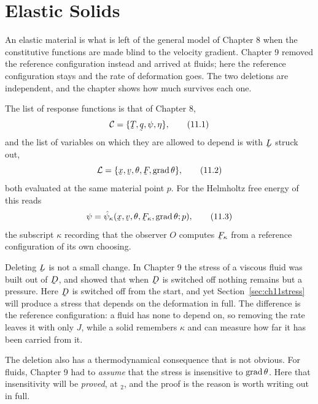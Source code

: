 \chapter{Elastic Solids}

An elastic material is what is left of the general model of Chapter 8
when the constitutive functions are made blind to the velocity gradient.
Chapter 9 removed the reference configuration instead and arrived at
fluids; here the reference configuration stays and the rate of
deformation goes. The two deletions are independent, and the chapter
shows how much survives each one.

The list of response functions is that of Chapter 8,
\begin{equation}
   \mathcal{C}=\{\bT,\bq,\psi,\eta\},
   \tag{11.1}\label{eq:11.1}
\end{equation}
and the list of variables on which they are allowed to depend is
 with $\bL$ struck out,
\begin{equation}
   \mathcal{L}=\{\bx,\bv,\theta,\bF,\grad\theta\},
   \tag{11.2}\label{eq:11.2}
\end{equation}
both evaluated at the same material point $p$. For the Helmholtz free
energy of  this reads
\begin{equation}
   \psi=\hat\psi_{\kappa}(\bx,\bv,\theta,\bF_{\kappa},\grad\theta;p),
   \tag{11.3}\label{eq:11.3}
\end{equation}
the subscript $\kappa$ recording that the observer $O$ computes
$\bF_{\kappa}$ from a reference configuration of its own choosing.

\begin{remark}%
\label{rem:ch11delete}
Deleting $\bL$ is not a small change. In Chapter 9 the stress of a
viscous fluid was built out of $\bD$, and  showed that when
$\bD$ is switched off nothing remains but a pressure. Here $\bD$ is
switched off from the start, and yet Section~\ref{sec:ch11stress} will
produce a stress that depends on the deformation in full. The
difference is the reference configuration: a fluid has none to depend
on, so removing the rate leaves it with only $J$, while a solid
remembers $\kappa$ and can measure how far it has been carried from it.

The deletion also has a thermodynamical consequence that is not
obvious. For fluids, Chapter 9 had to \emph{assume} that the stress is
insensitive to $\operatorname{grad}\theta$. Here that insensitivity will be
\emph{proved}, at $_{2}$, and the proof is the reason
 is worth writing out in full.
\end{remark}

